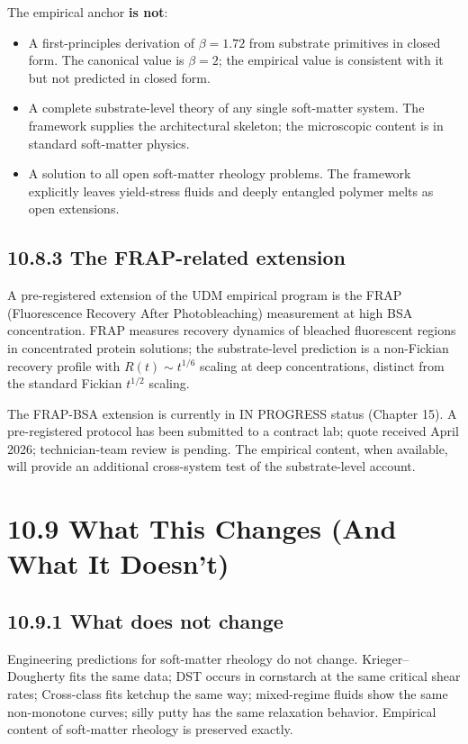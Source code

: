 \documentclass[11pt]{book}
\begin{document}
The empirical anchor \textbf{is not}:
\begin{itemize}
\item A first-principles derivation of $\beta = 1.72$ from substrate primitives in closed form. The canonical value is $\beta = 2$; the empirical value is consistent with it but not predicted in closed form.
\item A complete substrate-level theory of any single soft-matter system. The framework supplies the architectural skeleton; the microscopic content is in standard soft-matter physics.
\item A solution to all open soft-matter rheology problems. The framework explicitly leaves yield-stress fluids and deeply entangled polymer melts as open extensions.
\end{itemize}

\subsection{10.8.3 The FRAP-related extension}

A pre-registered extension of the UDM empirical program is the FRAP (Fluorescence Recovery After Photobleaching) measurement at high BSA concentration. FRAP measures recovery dynamics of bleached fluorescent regions in concentrated protein solutions; the substrate-level prediction is a non-Fickian recovery profile with $R(t) \sim t^{1/6}$ scaling at deep concentrations, distinct from the standard Fickian $t^{1/2}$ scaling.

The FRAP-BSA extension is currently in IN PROGRESS status (Chapter 15). A pre-registered protocol has been submitted to a contract lab; quote received April 2026; technician-team review is pending. The empirical content, when available, will provide an additional cross-system test of the substrate-level account.

\section{10.9 What This Changes (And What It Doesn't)}

\subsection{10.9.1 What does not change}

Engineering predictions for soft-matter rheology do not change. Krieger–Dougherty fits the same data; DST occurs in cornstarch at the same critical shear rates; Cross-class fits ketchup the same way; mixed-regime fluids show the same non-monotone curves; silly putty has the same relaxation behavior. Empirical content of soft-matter rheology is preserved exactly.
\end{document}
